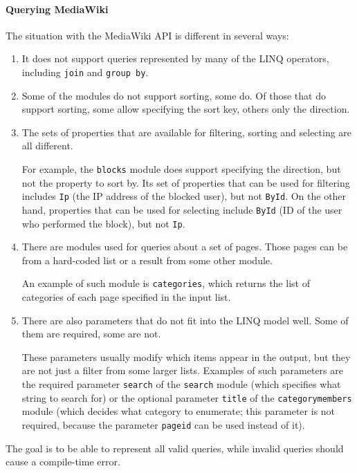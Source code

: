 \paragraph{Querying MediaWiki}

The situation with the MediaWiki \ac{API} is different in several ways:

\begin{enumerate}
\item It does not support queries represented by many of the LINQ operators, including \lstinline{join} and \lstinline{group by}.
\item Some of the modules do not support sorting, some do. Of those that do support sorting, some allow specifying the sort key, others only the direction.
\item The sets of properties that are available for filtering, sorting and selecting are all different.

For example, the \texttt{blocks} module does support specifying the direction, but not the property to sort by.
Its set of properties that can be used for filtering includes \lstinline{Ip}
(the \ac{IP} address of the blocked user), but not \lstinline{ById}.
On the other hand, properties that can be used for selecting include \lstinline{ById}
(ID of the user who performed the block), but not \lstinline{Ip}.

\item There are modules used for queries about a set of pages. Those pages can be from a hard-coded list or a result from some other module.

An example of such module is \texttt{categories}, which returns the list of categories of each page
specified in the input list.

\item There are also parameters that do not fit into the LINQ model well. Some of them are required, some are not.

These parameters usually modify which items appear in the output,
but they are not just a filter from some larger lists.
Examples of such parameters are the required parameter \texttt{search} of the \texttt{search} module
(which specifies what string to search for)
or the optional parameter \texttt{title} of the \texttt{categorymembers} module
(which decides what category to enumerate;
this parameter is not required, because the parameter \texttt{pageid} can be used instead of it).
\end{enumerate}

The goal is to be able to represent all valid queries, while invalid queries should cause a compile-time error.

